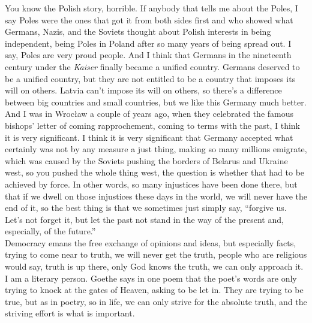 You know the Polish story, horrible. If anybody that tells me about the Poles, I say Poles were the ones that got it from both sides first and who showed what Germans, Nazis, and the Soviets thought about Polish interests in being independent, being Poles in Poland after so many years of being spread out. I say, Poles are very proud people. And I think that Germans in the nineteenth century under the \textit{Kaiser} finally became a unified country. Germans deserved to be a unified country, but they are not entitled to be a country that imposes its will on others. Latvia can't impose its will on others, so there's a difference between big countries and small countries, but we like this Germany much better. And I was in Wrocław a couple of years ago, when they celebrated the famous bishops’ letter of coming rapprochement, coming to terms with the past, I think it is very significant. I think it is very significant that Germany accepted what certainly was not by any measure a just thing, making so many millions emigrate, which was caused by the Soviets pushing the borders of Belarus and Ukraine west, so you pushed the whole thing west, the question is whether that had to be achieved by force. In other words, so many injustices have been done there, but that if we dwell on those injustices these days in the world, we will never have the end of it, so the best thing is that we sometimes just simply say, ``forgive us. Let's not forget it, but let the past not stand in the way of the present and, especially, of the future.'' \\
Democracy emans the free exchange of opinions and ideas, but especially facts, trying to come near to truth, we will never get the truth, people who are religious would say, truth is up there, only God knows the truth, we can only approach it. I am a literary person. Goethe says in one poem that the poet’s words are only trying to knock at the gates of Heaven, asking to be let in. They are trying to be true, but as in poetry, so in life, we can only strive for the absolute truth, and the striving effort is what is important. \\
